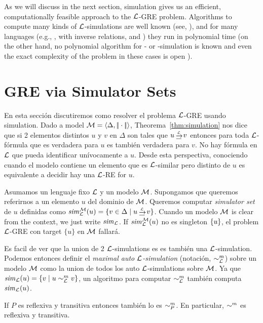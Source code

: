 As we will discuss in the next section, simulation gives us an
efficient, computationally feasible approach to the $\mathcal{L}$-GRE
problem. Algorithms to compute many kinds of $\mathcal{L}$-simulations are
well known (see, \cite{H71,PT87,HHK95,DPP03}), and for many
languages  (e.g., \ALC, \ALC with inverse relations,  \ELAN and \EL)
they run in polynomial time (on the other hand, no polynomial
algorithm for \FOL- or \EPFOL-simulation is known and even the exact
complexity of the problem in these cases is open
\cite{gare:comp79}).

\section{GRE via Simulator Sets}\label{sec:simulation}

En esta secci\'on discutiremos como resolver el problema $\mathcal{L}$-GRE
usando simulation. Dado a model $\mathcal{M} = \langle \Delta,
|\!|\cdot|\!| \rangle$, Theorema~\ref{thm:simulation} nos dice que si 2 elementos distintos $u$ y $v$ en $\Delta$ son tales que $u
\simul{\+L} v$ entonces para toda $\mathcal{L}$-f\'ormula que es verdadera para $u$ es tambi\'en verdadera para $v$. No hay f\'ormula en $\mathcal{L}$ que pueda identificar un\'ivocamente a $u$. Desde esta perspectiva, conociendo cuando el modelo contiene un elemento que es $\mathcal{L}$-similar pero distinto de $u$ es
equivalente a decidir hay una $\mathcal{L}$-RE for $u$.


Asumamos un lenguaje fixo $\mathcal{L}$ y un modelo $\mathcal{M}$.  Supongamos que queremos referirnos a un elemento $u$ del dominio de $\mathcal{M}$. Queremos computar \emph{simulator set} de $u$ definidas como
$\simset_{\+L}^{\+M}(u) = \cset{v \in \Delta \mid u \simul{\+L} v}$.
Cuando un modelo $\mathcal{M}$ is clear from the context, we just write
${\it sim}_{\mathcal{L}}$.
 If ${\it sim}_{\mathcal{L}}^{\mathcal{M}}(u)$ no es singleton $\{u\}$,
el problem $\mathcal{L}$-GRE con target $\{u\}$ en $\mathcal{M}$ fallar\'a.

\iffullversion
Es facil de ver que la union de 2 $\mathcal{L}$-simulations es
es tambi\'en una $\mathcal{L}$-simulation. Podemos entonces definir el \emph{maximal
auto $\mathcal{L}$-simulation} (notaci\'on, $\sim^m_{\mathcal{L}}$) sobre un modelo $\mathcal{M}$ como la union de todos los
auto $\mathcal{L}$-simulations sobre $\mathcal{M}$. Ya que
${\it sim}_{\mathcal{L}}(u) = \{v \mid u \sim^m_{\mathcal{L}} v\}$, un algoritmo
para computar $\sim^m_{\mathcal{L}}$ tambi\'en computa ${\it sim}_{\mathcal{L}}(u)$.
\else
\fi

\iffullversion
If $P$ es reflexiva y transitiva entonces tambi\'en lo es $\sim^m_P$. En
particular, $\sim^m$ es reflexiva y transitiva.
\else
\fi



